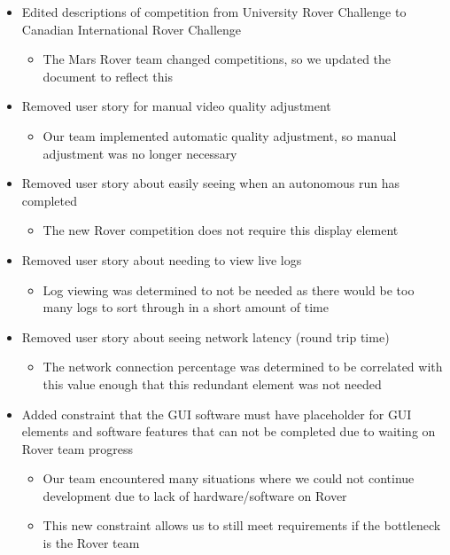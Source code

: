 \begin{itemize}
\item Edited descriptions of competition from University Rover Challenge to Canadian International Rover Challenge
	\begin{itemize}
	\item The Mars Rover team changed competitions, so we updated the document to reflect this
	\end{itemize}
    
\item Removed user story for manual video quality adjustment
	\begin{itemize}
	\item Our team implemented automatic quality adjustment, so manual adjustment was no longer necessary
	\end{itemize}
    
\item Removed user story about easily seeing when an autonomous run has completed
	\begin{itemize}
	\item The new Rover competition does not require this display element
	\end{itemize}
    
\item Removed user story about needing to view live logs
	\begin{itemize}
	\item Log viewing was determined to not be needed as there would be too many logs to sort through in a short amount of time
	\end{itemize}
    
\item Removed user story about seeing network latency (round trip time)
	\begin{itemize}
	\item The network connection percentage was determined to be correlated with this value enough that this redundant element was not needed
	\end{itemize}

\item Added constraint that the GUI software must have placeholder for GUI elements and software features that can not be completed due to waiting on Rover team progress
	\begin{itemize}
	\item Our team encountered many situations where we could not continue development due to lack of hardware/software on Rover
    \item This new constraint allows us to still meet requirements if the bottleneck is the Rover team
	\end{itemize}
    

\end{itemize}
